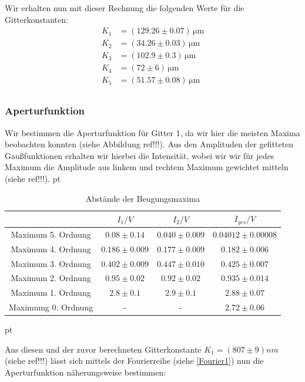 \documentclass[12pt]{article}
\begin{document}
Wir erhalten nun mit dieser Rechnung die folgenden Werte für die Gitterkonstanten:
\begin{align*}
	K_1&=(129.26\pm0.07)\,\mathrm{\mu m}\\
	K_2&=(34.26\pm0.03)\,\mathrm{\mu m}\\
	K_3&=(102.9\pm0.3)\,\mathrm{\mu m}\\
	K_4&=(72\pm6)\,\mathrm{\mu m}\\
	K_5&=(51.57\pm0.08)\,\mathrm{\mu m}\\
\end{align*}


\subsubsection{Aperturfunktion}


Wir bestimmen die Aperturfunktion für Gitter 1, da wir hier die meisten Maxima beobachten konnten (siehe Abbildung ref!!!).
Aus den Amplituden der gefitteten  Gaußfunktionen erhalten wir hierbei die Intensität, wobei wir wir für jedes Maximum die Amplitude aus linkem und rechtem Maximum gewichtet mitteln (siehe ref!!!). 
  pt
 \begin{table}[h!]
 {\centering
\begin{tabular}{c||c|c|c}
 					& $I_1/V$ 	& $I_2/V$ & $I_{ges}/V$	\\ \hline\hline
Maximum 5. Ordnung     & $0.08 \pm 0.14$  & $0.040 \pm 0.009$      &  $0.04012 \pm  0.00008$                       \\ \hline
Maximum 4. Ordnung		& $0.186 \pm 0.009$ 	&  $0.177 \pm 0.009$    	&  $0.182 \pm 0.006$ \\ \hline 
Maximum 3. Ordnung	&	 $0.402 \pm 0.009$ 	   	&  $0.447 \pm 0.010$  	&  $0.425 \pm 0.007$  \\ \hline
Maximum 2. Ordnung      	&  $0.95 \pm 0.02$  	&  $0.92 \pm 0.02$  &  $0.935 \pm 0.014$  \\ \hline
Maximum 1. Ordnung    & $2.8 \pm 0.1$ & $2.9 \pm 0.1$ &   $2.88 \pm 0.07$        \\ \hline                                           
Maximumg 0. Ordnung  & -  & - & $2.72 \pm 0.06$
 \end{tabular}
 \caption{Abstände der Beugungsmaxima}}
\end{table}
 pt


Aus diesen und der zuvor berechneten Gitterkonstante $K_1 = (807 \pm 9) nm$ (siehe ref!!!) lässt sich mittels der Fourierreihe (siehe \ref{Fourier1}) nun die Aperturfunktion näherungsweise bestimmen:
\end{document}
